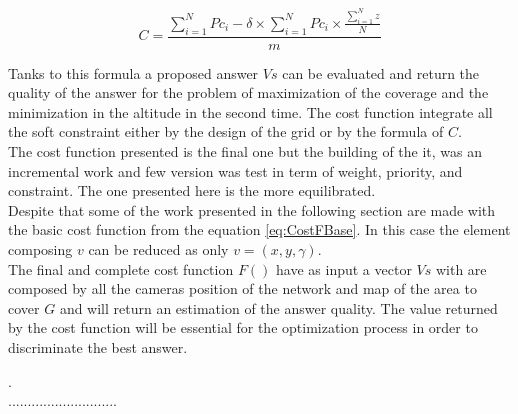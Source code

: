 \begin{equation}\label{eq:CostF}
C =  \frac{\sum_{i=1}^N{Pc_i}  - \delta  \times \sum_{i=1}^N {Pc_i} \times \frac{\sum_{i=1}^N z}{N}  }{m}   
\end{equation}

Tanks to this formula a proposed answer $Vs$ can be evaluated and return the quality of the answer for the problem of maximization of the coverage and the minimization in the altitude in the second time.  The cost function integrate all the soft constraint either by the design of the grid or by the formula of $C$.\\

The cost function presented is  the final one but the building of the it, was an incremental work and few version was test in term of weight, priority, and constraint. The one presented here is the more equilibrated.\\ 
Despite that some of the work  presented in the following section are made with the basic cost function from the equation \ref{eq:CostFBase}. In this case the element composing $v$ can be reduced as only $v=(x,y,\gamma)$.\\

The final and complete cost function $F()$ have as input a vector $Vs$ with are composed by all the cameras position of the network and map of the area to cover $G$ and will return an estimation of the answer quality.
The value returned by the cost function will be essential for the optimization process in order to discriminate the best answer.  

 











.\\............................\\


